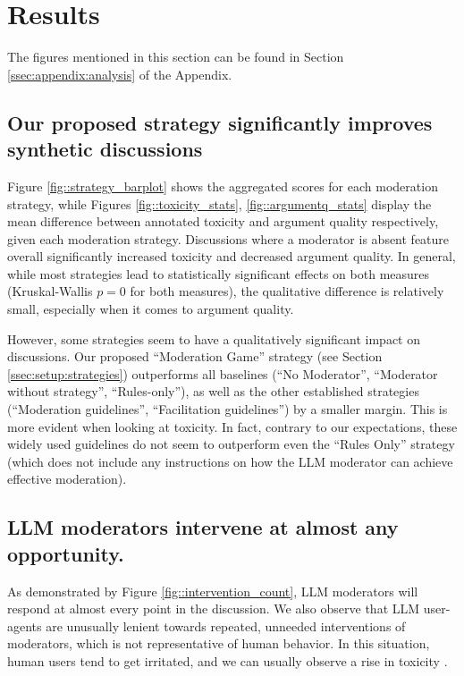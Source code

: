 %

\section{Results}

The figures mentioned in this section can be found in Section \ref{ssec:appendix:analysis} of the Appendix.

\subsection{Our proposed strategy significantly improves synthetic discussions}

Figure \ref{fig::strategy_barplot} shows the aggregated scores for each moderation strategy, while Figures \ref{fig::toxicity_stats}, \ref{fig::argumentq_stats} display the mean difference between annotated toxicity and argument quality respectively, given each moderation strategy. Discussions where a moderator is absent feature overall significantly increased toxicity and decreased argument quality. In general, while most strategies lead to statistically significant effects on both measures (Kruskal-Wallis $p=0$ for both measures), the qualitative difference is relatively small, especially when it comes to argument quality.

However, some strategies seem to have a qualitatively significant impact on discussions. Our proposed “Moderation Game” strategy (see Section \ref{ssec:setup:strategies}) outperforms all baselines (“No Moderator”, “Moderator without strategy”, “Rules-only”), as well as the other established strategies (“Moderation guidelines”, “Facilitation guidelines”) by a smaller margin. This is more evident when looking at toxicity.
In fact, contrary to our expectations, these widely used guidelines do not seem to outperform even the “Rules Only” strategy (which does not include any instructions on how the \ac{LLM} moderator can achieve effective moderation).



\subsection{LLM moderators intervene at almost any opportunity.}

As demonstrated by Figure \ref{fig::intervention_count}, \ac{LLM} moderators will respond at almost every point in the discussion. We also observe that \ac{LLM} user-agents are unusually lenient towards repeated, unneeded interventions of moderators, which is not representative of human behavior. In this situation, human users tend to get irritated, and we can usually observe a rise in toxicity \cite{schaffner_community_guidelines, make_reddit_great, proactive_moderation, cresci_pesonalized_interventions}.


